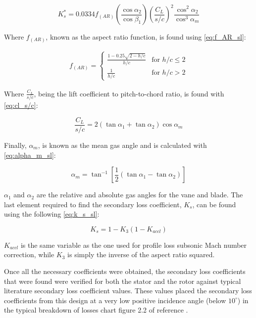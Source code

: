 \documentclass[12pt, letter]{report}
\begin{document}
\begin{equation}
\label{eq:k*_sl}
    K^*_s = 0.0334 f_{(AR)} \left(\frac{\cos \alpha_2}{\cos \beta_1}\right) \left(\frac{C_L}{s/c}\right)^2 \frac{\cos^2 \alpha_2}{\cos^3 \alpha_m}
\end{equation}

Where $f_{(AR)}$, known as the aspect ratio function, is found using \autoref{eq:f_AR_sl}:

\begin{equation}
\label{eq:f_AR_sl}
\begin{aligned}
f_{(AR)} = \begin{cases} 
\frac{1 - 0.25\sqrt{2 - h/c}}{h/c} & \text{for } h/c \leq 2 \\
\frac{1}{h/c} & \text{for } h/c > 2 
\end{cases}
\end{aligned}
\end{equation}

Where $\frac{C_L}{s/c}$, being the lift coefficient to pitch-to-chord ratio, is found with \autoref{eq:cl_s/c}:

\begin{equation}
\label{eq:cl_s/c}
    \frac{C_L}{s/c} = 2 \left(\tan \alpha_1 + \tan \alpha_2\right) \cos \alpha_m
\end{equation}

Finally, $\alpha_m$, is known as the mean gas angle and is calculated with \autoref{eq:alpha_m_sl}:

\begin{equation}
\label{eq:alpha_m_sl}
    \alpha_m = \tan^{-1} \left[\frac{1}{2} \left(\tan \alpha_1 - \tan \alpha_2\right)\right]
\end{equation}

$\alpha_1$ and $\alpha_2$ are the relative and absolute gas angles for the vane and blade. The last element required to find the secondary loss coefficient, $K_s$, can be found using the following \autoref{eq:k_s_sl}:

\begin{equation}
\label{eq:k_s_sl}
    K_s = 1 - K_3 (1 - K_{accl})
\end{equation}

$K_{accl}$ is the same variable as the one used for profile loss subsonic Mach number correction, while $K_3$ is simply the inverse of the aspect ratio squared. 

Once all the necessary coefficients were obtained, the secondary loss coefficients that were found were verified for both the stator and the rotor against typical literature secondary loss coefficient values. These values placed the secondary loss coefficients from this design at a very low positive incidence angle (below $10^\circ$) in the typical breakdown of losses chart figure 2.2 of reference \cite{moustapha2003}.
\end{document}
